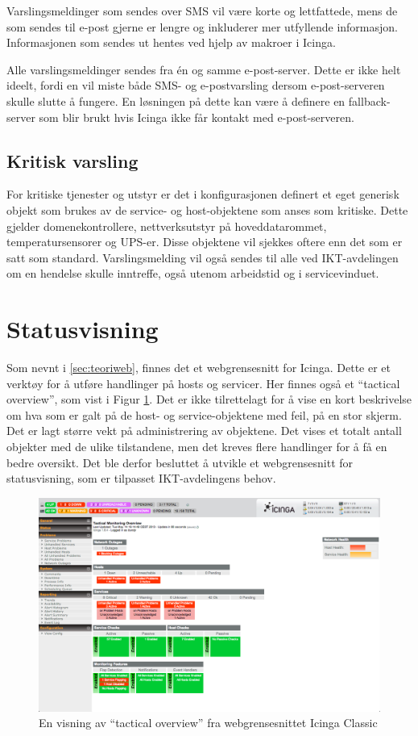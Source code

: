 Varslingsmeldinger som sendes over SMS vil være korte og lettfattede, mens de som sendes til e-post gjerne er lengre og inkluderer mer utfyllende informasjon. Informasjonen som sendes ut hentes ved hjelp av makroer i Icinga\cite{icingamacro}.

Alle varslingsmeldinger sendes fra én og samme e-post-server. Dette er ikke helt ideelt, fordi en vil miste både SMS- og e-postvarsling dersom e-post-serveren skulle slutte å fungere. En løsningen på dette kan være å definere en fallback-server som blir brukt hvis Icinga ikke får kontakt med e-post-serveren. 

\subsection{Kritisk varsling}
For kritiske tjenester og utstyr er det i konfigurasjonen definert et eget generisk objekt som brukes av de service- og host-objektene som anses som kritiske. Dette gjelder domenekontrollere, nettverksutstyr på hoveddatarommet, temperatursensorer og UPS-er. Disse objektene vil sjekkes oftere enn det som er satt som standard. Varslingsmelding vil også sendes til alle ved IKT-avdelingen om en hendelse skulle inntreffe, også utenom arbeidstid og i servicevinduet.

\section{Statusvisning}
Som nevnt i \ref{sec:teoriweb}, finnes det et webgrensesnitt for Icinga. Dette er et verktøy for å utføre handlinger på hosts og servicer. Her finnes også et ``tactical overview'', som vist i Figur \ref{icingawebgui}. Det er ikke tilrettelagt for å vise en kort beskrivelse om hva som er galt på de host- og service-objektene med feil, på en stor skjerm. Det er lagt større vekt på administrering av objektene. Det vises et totalt antall objekter med de ulike tilstandene, men det kreves flere handlinger for å få en bedre oversikt. Det ble derfor besluttet å utvikle et webgrensesnitt for statusvisning, som er tilpasset IKT-avdelingens behov.
\begin{figure}
	\centering
    \includegraphics[width=1.0\textwidth]{img/icinga_tactical}
    \caption{En visning av ``tactical overview'' fra webgrensesnittet Icinga Classic}
    \label{icingawebgui}
\end{figure}

